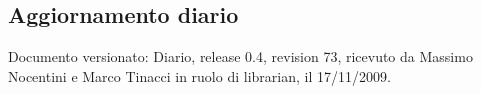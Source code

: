 \subsection{Aggiornamento diario}
Documento versionato: Diario, release 0.4, revision 73, ricevuto da Massimo 
Nocentini e Marco Tinacci in ruolo di librarian, il 17/11/2009. 